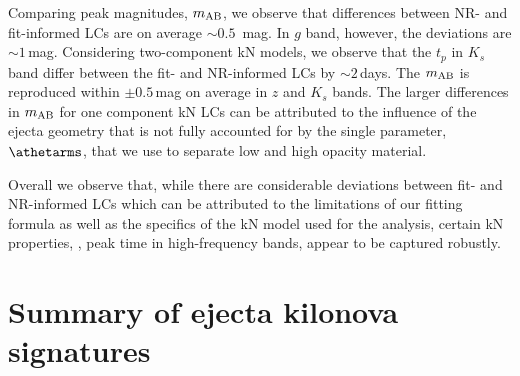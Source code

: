 Comparing peak magnitudes, $m_{\rm AB}$, we observe that differences 
between \ac{NR}- and fit-informed \acp{LC} are on average ${\sim}0.5$~mag. 
In $g$ band, however, the deviations are ${\sim}1\,$mag.
Considering two-component \ac{kN} models, we observe that the 
$t_p$ in $K_s$ band differ between the fit- and \ac{NR}-informed \acp{LC} by 
${\sim}2\,$days. The $m_{\rm AB}$ is reproduced within ${\pm}0.5\,$mag 
on average in $z$ and $K_s$ bands.
%
The larger differences in $m_{\rm AB}$ for one component \ac{kN} \acp{LC} 
can be attributed to the influence of the ejecta geometry that is not 
fully accounted for by the  single parameter, $\athetarms$, that we use to 
separate low and high opacity material. 

Overall we observe that, while there are considerable deviations between fit- and 
\ac{NR}-informed \acp{LC} which can be attributed to the limitations of 
our fitting formula as well as the specifics of the \ac{kN} model used for the 
analysis, certain \ac{kN} properties, \eg, peak time in high-frequency bands, 
appear to be captured robustly. 





\section{Summary of ejecta kilonova signatures}\label{sec:kilonova:summary}













